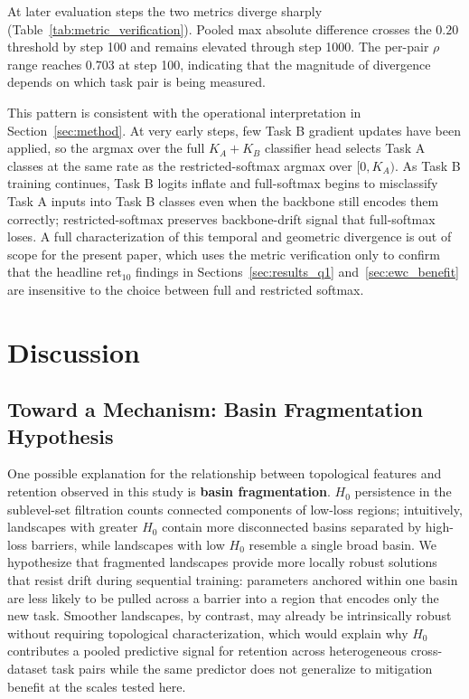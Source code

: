 \documentclass[10pt,twocolumn]{article}
\begin{document}
At later evaluation steps the two metrics diverge sharply (Table~\ref{tab:metric_verification}). Pooled max absolute difference crosses the $0.20$ threshold by step 100 and remains elevated through step 1000. The per-pair $\rho$ range reaches $0.703$ at step 100, indicating that the magnitude of divergence depends on which task pair is being measured.

This pattern is consistent with the operational interpretation in Section~\ref{sec:method}. At very early steps, few Task B gradient updates have been applied, so the argmax over the full $K_A + K_B$ classifier head selects Task A classes at the same rate as the restricted-softmax argmax over $[0, K_A)$. As Task B training continues, Task B logits inflate and full-softmax begins to misclassify Task A inputs into Task B classes even when the backbone still encodes them correctly; restricted-softmax preserves backbone-drift signal that full-softmax loses. A full characterization of this temporal and geometric divergence is out of scope for the present paper, which uses the metric verification only to confirm that the headline ret$_{10}$ findings in Sections~\ref{sec:results_q1} and~\ref{sec:ewc_benefit} are insensitive to the choice between full and restricted softmax.

\section{Discussion}
\label{sec:discussion}

\subsection{Toward a Mechanism: Basin Fragmentation Hypothesis}
\label{sec:hypothesis}

One possible explanation for the relationship between topological features and retention observed in this study is \textbf{basin fragmentation}. $H_0$ persistence in the sublevel-set filtration counts connected components of low-loss regions; intuitively, landscapes with greater $H_0$ contain more disconnected basins separated by high-loss barriers, while landscapes with low $H_0$ resemble a single broad basin. We hypothesize that fragmented landscapes provide more locally robust solutions that resist drift during sequential training: parameters anchored within one basin are less likely to be pulled across a barrier into a region that encodes only the new task. Smoother landscapes, by contrast, may already be intrinsically robust without requiring topological characterization, which would explain why $H_0$ contributes a pooled predictive signal for retention across heterogeneous cross-dataset task pairs while the same predictor does not generalize to mitigation benefit at the scales tested here.
\end{document}
